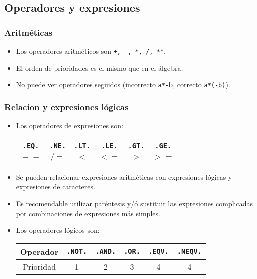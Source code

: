 \subsection{Operadores y expresiones}

\subsubsection{Aritméticas}

\begin{itemize}
	\item Los operadores aritméticos son {\tt +, -, *, /, **}.
	\item El orden de prioridades es el mismo que en el álgebra.
	\item No puede ver operadores seguidos (incorrecto {\tt a*-b}, correcto {\tt a*(-b)}).
\end{itemize}

\subsubsection{Relacion y expresiones lógicas}

\begin{itemize}
	\item Los operadores de expresiones son:
	      \begin{table}[h!] \centering
		      \begin{tabular}{|c|c|c|c|c|c|}
			      \hline
			      {\tt .EQ.} & {\tt .NE.} & {\tt .LT.} & {\tt .LE.} & {\tt .GT.} & {\tt .GE.} \\ \hline
			      $==$       & $/=$       & $<$        & $<=$       & $>$        & $>=$       \\    \hline
		      \end{tabular}
	      \end{table}

	\item Se pueden relacionar expresiones aritméticas con expresiones lógicas y expresiones de caracteres.
	\item Es recomendable utilizar paréntesis y/ó sustituir las expresiones complicadas por combinaciones de expresiones más simples.
	\item Los operadores lógicos son:
	      \begin{table}[h!] \centering
		      \begin{tabular}{|c|c|c|c|c|c|}
			      \hline  Operador & {\tt .NOT.} & {\tt .AND.} & {\tt .OR.} & {\tt .EQV.} & {\tt .NEQV.} \\ \hline Prioridad
			                       & 1           & 2           & 3          & 4           & 4            \\    \hline
		      \end{tabular}
	      \end{table}
\end{itemize}

